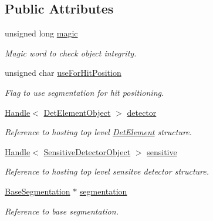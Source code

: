 \subsection*{Public Attributes}
\begin{DoxyCompactItemize}
\item 
unsigned long \hyperlink{class_d_d4hep_1_1_geometry_1_1_segmentation_object_a2fb8a80e389d915e7c74499f09fd341b}{magic}
\begin{DoxyCompactList}\small\item\em Magic word to check object integrity. \item\end{DoxyCompactList}\item 
unsigned char \hyperlink{class_d_d4hep_1_1_geometry_1_1_segmentation_object_a50926f063e074096e83ee667d70114a7}{useForHitPosition}
\begin{DoxyCompactList}\small\item\em Flag to use segmentation for hit positioning. \item\end{DoxyCompactList}\item 
\hyperlink{class_d_d4hep_1_1_handle}{Handle}$<$ \hyperlink{class_d_d4hep_1_1_geometry_1_1_det_element_object}{DetElementObject} $>$ \hyperlink{class_d_d4hep_1_1_geometry_1_1_segmentation_object_aa9f9012806e2dfff465ae66650f10b94}{detector}
\begin{DoxyCompactList}\small\item\em Reference to hosting top level \hyperlink{class_d_d4hep_1_1_geometry_1_1_det_element}{DetElement} structure. \item\end{DoxyCompactList}\item 
\hyperlink{class_d_d4hep_1_1_handle}{Handle}$<$ \hyperlink{class_d_d4hep_1_1_geometry_1_1_sensitive_detector_object}{SensitiveDetectorObject} $>$ \hyperlink{class_d_d4hep_1_1_geometry_1_1_segmentation_object_ae62042fd318764e7744b87de21cb25ad}{sensitive}
\begin{DoxyCompactList}\small\item\em Reference to hosting top level sensitve detector structure. \item\end{DoxyCompactList}\item 
\hyperlink{class_d_d4hep_1_1_d_d_segmentation_1_1_segmentation}{BaseSegmentation} $\ast$ \hyperlink{class_d_d4hep_1_1_geometry_1_1_segmentation_object_a96eb25f8256d85ec907729f371ad315c}{segmentation}
\begin{DoxyCompactList}\small\item\em Reference to base segmentation. \item\end{DoxyCompactList}\end{DoxyCompactItemize}


